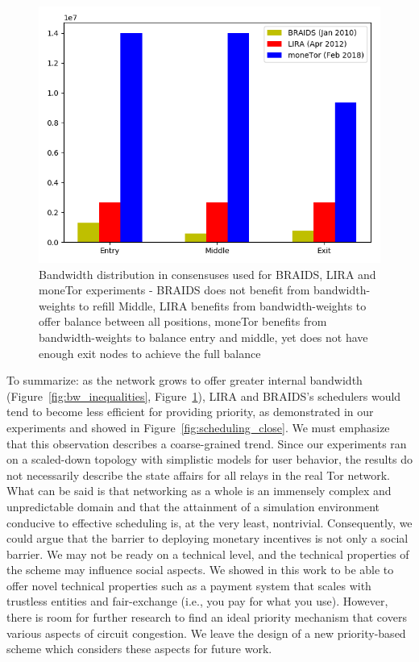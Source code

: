 \begin{figure}
	\centering \includegraphics[scale=0.415]{images/bw_analysis_comp.png}
  \caption{Bandwidth distribution in consensuses used for BRAIDS, LIRA and moneTor experiments - BRAIDS does not benefit from bandwidth-weights to refill Middle, LIRA benefits from bandwidth-weights to offer balance between all positions, moneTor benefits from bandwidth-weights to balance entry and middle, yet does not have enough exit nodes to achieve the full balance}
  \label{fig:bw_comp}
\end{figure}
 
To summarize: as the network grows to offer greater internal bandwidth (Figure~\ref{fig:bw_inequalities}, Figure~\ref{fig:bw_comp}), LIRA and BRAIDS's schedulers would tend to become less efficient for providing priority, as demonstrated in our experiments and showed in Figure~\ref{fig:scheduling_close}.
We must emphasize that this observation describes a coarse-grained trend.
Since our experiments ran on a scaled-down topology with simplistic models for user behavior, the results do not necessarily describe the state affairs for all relays in the real Tor network.
What can be said is that networking as a whole is an immensely complex and unpredictable domain and that the attainment of a simulation environment conducive to effective scheduling is, at the very least, nontrivial.
Consequently, we could argue that the barrier to deploying monetary incentives is not only a social barrier.
We may not be ready on a technical level, and the technical properties of the scheme may influence social aspects.
We showed in this work to be able to offer novel technical properties such as a payment system that scales with trustless entities and fair-exchange (i.e., you pay for what you use).
However, there is room for further research to find an ideal priority mechanism that covers various aspects of circuit congestion.
We leave the design of a new priority-based scheme which considers these aspects for future work.
